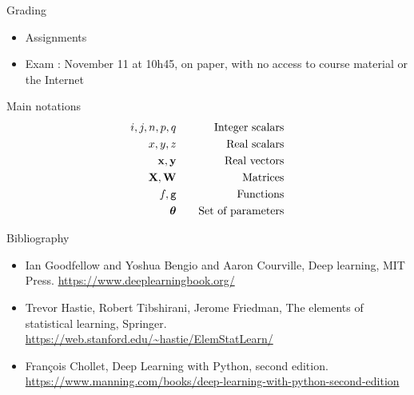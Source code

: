 \documentclass[xcolor=pdftex,dvipsnames,table,mathserif]{beamer}
\begin{document}
\begin{frame}{Grading}

\begin{itemize}
\item Assignments
\item Exam : November 11 at 10h45, on paper, with no access to course material or the Internet
\end{itemize}

\end{frame}

\begin{frame}{Main notations}
  \begin{eqnarray*}
    i, j, n, p, q & \hspace{1em} & \text{Integer scalars} \\
    x, y, z & \hspace{1em} & \text{Real scalars} \\
    \mathbf{x}, \mathbf{y} & \hspace{1em} & \text{Real vectors} \\
    \mathbf{X}, \mathbf{W} & \hspace{1em} & \text{Matrices} \\
    f, \texttt{g} & \hspace{1em} & \text{Functions} \\
    \boldsymbol{\theta} & \hspace{1em} & \text{Set of parameters} \\
    \end{eqnarray*}
\end{frame}


\begin{frame}{Bibliography}

  \begin{itemize}
  \item Ian Goodfellow and Yoshua Bengio and Aaron Courville, Deep learning, MIT Press. \url{https://www.deeplearningbook.org/}

  \item Trevor Hastie, Robert Tibshirani, Jerome Friedman, The elements of statistical learning, Springer. \url{https://web.stanford.edu/~hastie/ElemStatLearn/}

  \item François Chollet, Deep Learning with Python, second edition. \url{https://www.manning.com/books/deep-learning-with-python-second-edition}

  \end{itemize}
\end{frame}
\end{document}
